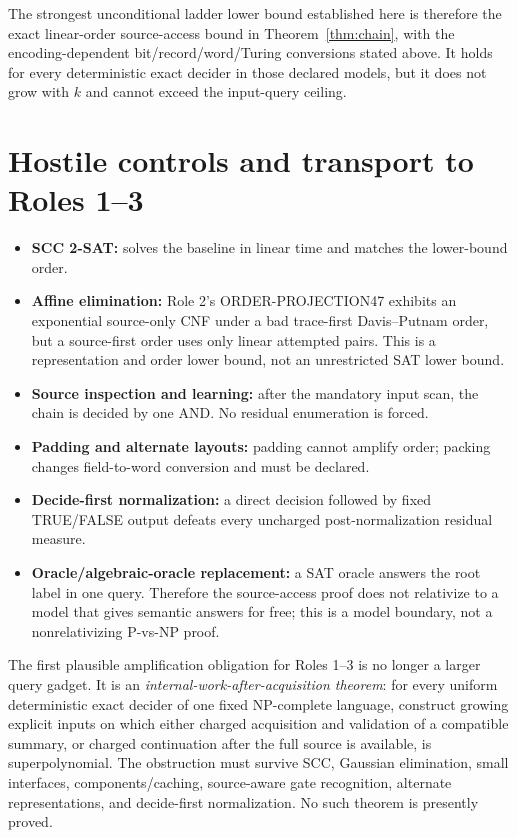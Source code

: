 \documentclass[11pt]{article}
\begin{document}
The strongest unconditional ladder lower bound established here is therefore
the exact linear-order source-access bound in Theorem~\ref{thm:chain}, with the
encoding-dependent bit/record/word/Turing conversions stated above.  It holds
for every deterministic exact decider in those declared models, but it does
not grow with $k$ and cannot exceed the input-query ceiling.

\section*{Hostile controls and transport to Roles 1--3}
\begin{itemize}
\item \textbf{SCC 2-SAT:} solves the baseline in linear time and matches the
lower-bound order.
\item \textbf{Affine elimination:} Role 2's ORDER-PROJECTION47 exhibits an
exponential source-only CNF under a bad trace-first Davis--Putnam order, but a
source-first order uses only linear attempted pairs.  This is a representation
and order lower bound, not an unrestricted SAT lower bound.
\item \textbf{Source inspection and learning:} after the mandatory input scan,
the chain is decided by one AND.  No residual enumeration is forced.
\item \textbf{Padding and alternate layouts:} padding cannot amplify order;
packing changes field-to-word conversion and must be declared.
\item \textbf{Decide-first normalization:} a direct decision followed by fixed
TRUE/FALSE output defeats every uncharged post-normalization residual measure.
\item \textbf{Oracle/algebraic-oracle replacement:} a SAT oracle answers the
root label in one query.  Therefore the source-access proof does not relativize
to a model that gives semantic answers for free; this is a model boundary, not
a nonrelativizing P-vs-NP proof.
\end{itemize}

The first plausible amplification obligation for Roles 1--3 is no longer a
larger query gadget.  It is an \emph{internal-work-after-acquisition theorem}:
for every uniform deterministic exact decider of one fixed NP-complete
language, construct growing explicit inputs on which either charged acquisition
and validation of a compatible summary, or charged continuation after the full
source is available, is superpolynomial.  The obstruction must survive SCC,
Gaussian elimination, small interfaces, components/caching, source-aware gate
recognition, alternate representations, and decide-first normalization.  No
such theorem is presently proved.
\end{document}
